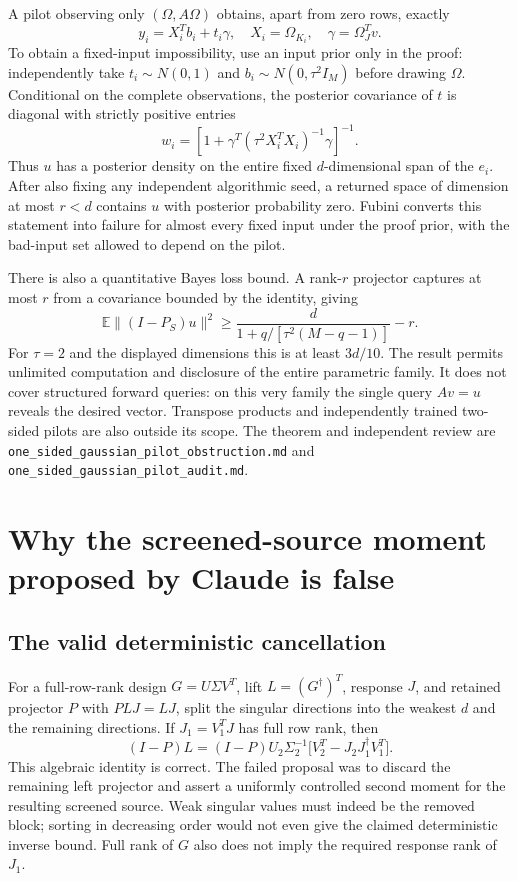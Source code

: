 \documentclass[11pt,oneside,openany,a4paper]{report}
\numberwithin{equation}{chapter}
\theoremstyle{definition}
\theoremstyle{remark}
\newcommand{\sourcefile}[1]{{\small\nolinkurl{#1}}}
\begin{document}
A pilot observing only $(\Omega,A\Omega)$ obtains, apart from zero
rows, exactly
\[
 y_i=X_i^Tb_i+t_i\gamma,
 \quad X_i=\Omega_{K_i},\quad \gamma=\Omega_J^Tv.
\]
To obtain a fixed-input impossibility, use an input prior only in the
proof: independently take $t_i\sim N(0,1)$ and
$b_i\sim N(0,\tau^2 I_M)$ before drawing $\Omega$.  Conditional on
the complete observations, the posterior covariance of $t$ is diagonal
with strictly positive entries
\[
 w_i=\left[1+\gamma^T(\tau^2X_i^TX_i)^{-1}\gamma\right]^{-1}.
\]
Thus $u$ has a posterior density on the entire fixed $d$-dimensional
span of the $e_i$.  After also fixing any independent algorithmic seed,
a returned space of dimension at most $r<d$ contains $u$ with posterior
probability zero.  Fubini converts this statement into failure for
almost every fixed input under the proof prior, with the bad-input set
allowed to depend on the pilot.

There is also a quantitative Bayes loss bound.  A rank-$r$ projector
captures at most $r$ from a covariance bounded by the identity, giving
\[
 \mathbb E\|(I-P_S)u\|^2
 \ge\frac{d}{1+q/[\tau^2(M-q-1)]}-r.
\]
For $\tau=2$ and the displayed dimensions this is at least $3d/10$.
The result permits unlimited computation and disclosure of the entire
parametric family.  It does not cover structured forward queries: on
this very family the single query $Av=u$ reveals the desired vector.
Transpose products and independently trained two-sided pilots are also
outside its scope.  The theorem and independent review are
\sourcefile{one_sided_gaussian_pilot_obstruction.md} and
\sourcefile{one_sided_gaussian_pilot_audit.md}.

\section{Why the screened-source moment proposed by Claude is false}

\subsection{The valid deterministic cancellation}

For a full-row-rank design $G=U\Sigma V^T$, lift
$L=(G^\dagger)^T$, response $J$, and retained projector $P$ with
$PLJ=LJ$, split the singular directions into the weakest $d$ and the
remaining directions.  If $J_1=V_1^TJ$ has full row rank, then
\[
 (I-P)L=(I-P)U_2\Sigma_2^{-1}
       \bigl[V_2^T-J_2J_1^\dagger V_1^T\bigr].
\]
This algebraic identity is correct.  The failed proposal was to discard
the remaining left projector and assert a uniformly controlled second
moment for the resulting screened source.  Weak singular values must
indeed be the removed block; sorting in decreasing order would not even
give the claimed deterministic inverse bound.  Full rank of $G$ also
does not imply the required response rank of $J_1$.
\end{document}
